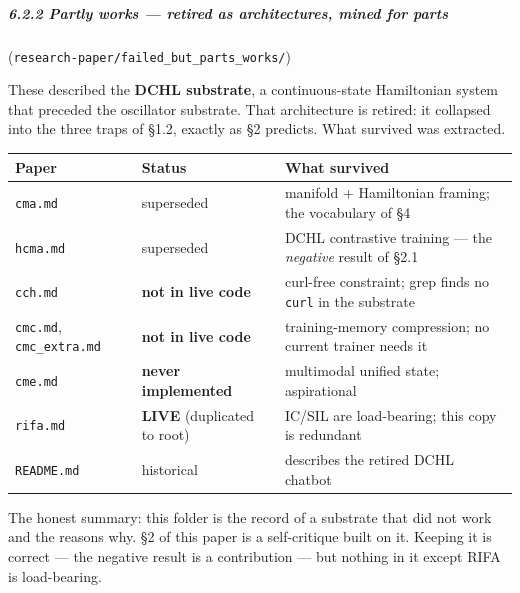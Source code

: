 \documentclass[
  11pt,
  a4paper,
]{article}
\begin{document}
\subparagraph{6.2.2 Partly works --- retired as architectures, mined for
parts}\label{partly-works-retired-as-architectures-mined-for-parts}

(\texttt{research-paper/failed\_but\_parts\_works/})

These described the \textbf{DCHL substrate}, a continuous-state
Hamiltonian system that preceded the oscillator substrate. That
architecture is retired: it collapsed into the three traps of §1.2,
exactly as §2 predicts. What survived was extracted.

\begin{longtable}[]{@{}
  >{\raggedright\arraybackslash}p{}
  >{\raggedright\arraybackslash}p{}
  >{\raggedright\arraybackslash}p{}@{}}
\toprule\noalign{}
\begin{minipage}[b]{\linewidth}\raggedright
Paper
\end{minipage} & \begin{minipage}[b]{\linewidth}\raggedright
Status
\end{minipage} & \begin{minipage}[b]{\linewidth}\raggedright
What survived
\end{minipage} \\
\midrule\noalign{}
\endhead
\bottomrule\noalign{}
\endlastfoot
\texttt{cma.md} & superseded & manifold + Hamiltonian framing; the
vocabulary of §4 \\
\texttt{hcma.md} & superseded & DCHL contrastive training --- the
\emph{negative} result of §2.1 \\
\texttt{cch.md} & \textbf{not in live code} & curl-free constraint; grep
finds no \texttt{curl} in the substrate \\
\texttt{cmc.md}, \texttt{cmc\_extra.md} & \textbf{not in live code} &
training-memory compression; no current trainer needs it \\
\texttt{cme.md} & \textbf{never implemented} & multimodal unified state;
aspirational \\
\texttt{rifa.md} & \textbf{LIVE} (duplicated to root) & IC/SIL are
load-bearing; this copy is redundant \\
\texttt{README.md} & historical & describes the retired DCHL chatbot \\
\end{longtable}

The honest summary: this folder is the record of a substrate that did
not work and the reasons why. §2 of this paper is a self-critique built
on it. Keeping it is correct --- the negative result is a contribution
--- but nothing in it except RIFA is load-bearing.
\end{document}
